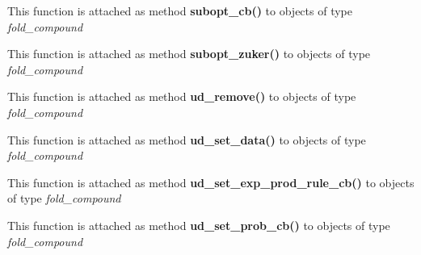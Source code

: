 \begin{DoxyRefList}
\item[\label{wrappers__wrappers000097}%
\Hypertarget{wrappers__wrappers000097}%
Global \hyperlink{group__subopt__wuchty_ga1053837e6b6f158093508f8a70998352}{vrna\+\_\+subopt\+\_\+cb} (vrna\+\_\+fold\+\_\+compound\+\_\+t $\ast$vc, int delta, vrna\+\_\+subopt\+\_\+callback $\ast$cb, void $\ast$data)]This function is attached as method {\bfseries subopt\+\_\+cb()} to objects of type {\itshape fold\+\_\+compound}  
\item[\label{wrappers__wrappers000098}%
\Hypertarget{wrappers__wrappers000098}%
Global \hyperlink{group__subopt__zuker_gababde9d210eb433854f1e71da7815fbb}{vrna\+\_\+subopt\+\_\+zuker} (vrna\+\_\+fold\+\_\+compound\+\_\+t $\ast$vc)]This function is attached as method {\bfseries subopt\+\_\+zuker()} to objects of type {\itshape fold\+\_\+compound}  
\item[\label{wrappers__wrappers000075}%
\Hypertarget{wrappers__wrappers000075}%
Global \hyperlink{group__domains__up_gada59cb0c498b812eadd010811af3f2d4}{vrna\+\_\+ud\+\_\+remove} (vrna\+\_\+fold\+\_\+compound\+\_\+t $\ast$vc)]This function is attached as method {\bfseries ud\+\_\+remove()} to objects of type {\itshape fold\+\_\+compound}  
\item[\label{wrappers__wrappers000076}%
\Hypertarget{wrappers__wrappers000076}%
Global \hyperlink{group__domains__up_gac1f18c312b91d80089534a87d956e58b}{vrna\+\_\+ud\+\_\+set\+\_\+data} (vrna\+\_\+fold\+\_\+compound\+\_\+t $\ast$vc, void $\ast$data, vrna\+\_\+callback\+\_\+free\+\_\+auxdata $\ast$free\+\_\+cb)]This function is attached as method {\bfseries ud\+\_\+set\+\_\+data()} to objects of type {\itshape fold\+\_\+compound}  
\item[\label{wrappers__wrappers000078}%
\Hypertarget{wrappers__wrappers000078}%
Global \hyperlink{group__domains__up_ga2fb1db2099da26c76247e1209ad4aa09}{vrna\+\_\+ud\+\_\+set\+\_\+exp\+\_\+prod\+\_\+rule\+\_\+cb} (vrna\+\_\+fold\+\_\+compound\+\_\+t $\ast$vc, vrna\+\_\+callback\+\_\+ud\+\_\+exp\+\_\+production $\ast$pre\+\_\+cb, vrna\+\_\+callback\+\_\+ud\+\_\+exp\+\_\+energy $\ast$exp\+\_\+e\+\_\+cb)]This function is attached as method {\bfseries ud\+\_\+set\+\_\+exp\+\_\+prod\+\_\+rule\+\_\+cb()} to objects of type {\itshape fold\+\_\+compound}  
\item[\label{wrappers__wrappers000079}%
\Hypertarget{wrappers__wrappers000079}%
Global \hyperlink{unstructured__domains_8h_a13ac877c9db89a1a5b5d9c0394148595}{vrna\+\_\+ud\+\_\+set\+\_\+prob\+\_\+cb} (vrna\+\_\+fold\+\_\+compound\+\_\+t $\ast$vc, vrna\+\_\+callback\+\_\+ud\+\_\+probs\+\_\+add $\ast$setter, vrna\+\_\+callback\+\_\+ud\+\_\+probs\+\_\+get $\ast$getter)]This function is attached as method {\bfseries ud\+\_\+set\+\_\+prob\+\_\+cb()} to objects of type {\itshape fold\+\_\+compound}  

\end{DoxyRefList}
